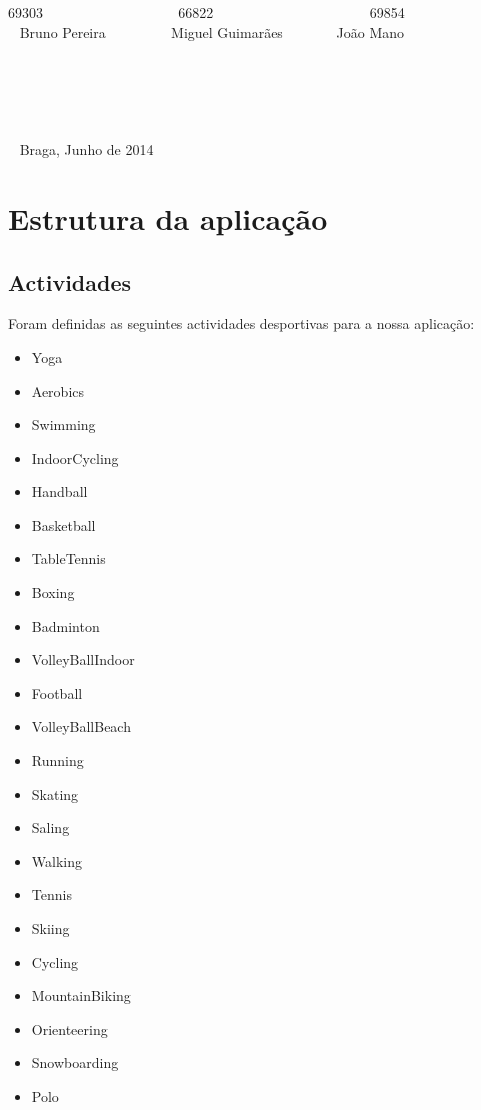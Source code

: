 \documentclass[10pt,notitlepage]{article}
\begin{document}
\begin{titlepage}
\begin{center}
69303 ~~~~~~~~~~~~~~~~~~ 66822 ~~~~~~~~~~~~~~~~~~~~~ 69854   \\~ Bruno Pereira  ~~~~~~~~ Miguel Guimarães ~~~~~~~João Mano  \\~ \\~ \\~ \\~ \\~ \\~ Braga, Junho de 2014
\end{center}
\end{titlepage}




\tableofcontents

\newpage


\section{Estrutura da aplicação}

\subsection{Actividades}
Foram definidas as seguintes actividades desportivas para a nossa aplicação:
\begin{multicols}{2}
\begin{itemize}
\item Yoga
\item Aerobics
\item Swimming
\item IndoorCycling
\item Handball
\item Basketball
\item TableTennis
\item Boxing
\item Badminton
\item VolleyBallIndoor
\item Football
\item VolleyBallBeach
\item Running
\item Skating
\item Saling
\item Walking
\item Tennis
\item Skiing
\item Cycling
\item MountainBiking
\item Orienteering
\item Snowboarding
\item Polo
\end{itemize}
\end{multicols}
\end{document}

